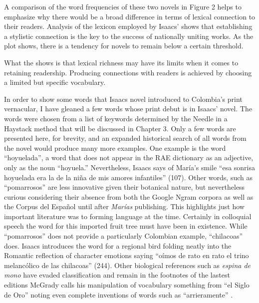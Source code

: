 A comparison of the word frequencies of these two novels in Figure 2 helps to emphasize why there would be a broad difference in terms of lexical connection to their readers.
Analysis of the lexicon employed by Isaacs' shows that establishing a stylistic connection is the key to the success of nationally uniting works. 
As the plot shows, there is a tendency for novels to remain below a certain threshold.

What the shows is that lexical richness may have its limits when it comes to retaining readership. 
Producing connections with readers is achieved by choosing a limited but specific vocabulary.


In order to show some words that Isaacs novel introduced to Colombia's print vernacular, I have gleaned a few words whose print debut is in Isaacs’ novel.
The words were chosen from a list of keywords determined by the Needle in a Haystack method that will be discussed in Chapter 3.
Only a few words are presented here, for brevity, and an expanded historical search of all words from the novel would produce many more examples.
One example is the word \enquote{hoyuelada}, a word that does not appear in the RAE dictionary as an adjective, only as the noun \enquote{hoyuela.}
Nevertheless, Isaacs says of María’s smile \enquote{esa sonrisa hoyuelada era la de la niña de mis amores infantiles} (107).
Other words, such as \enquote{pomarrosos} are less innovative given their botanical nature, but nevertheless curious considering their absence from both the Google Ngram corpora as well as the Corpus del Español until after \textit{Marías} publishing.
This highlights just how important literature was to forming language at the time.
Certainly in colloquial speech the word for this imported fruit tree must have been in existence.
While \enquote{pomarrosos} does not provide a particularly Colombian example, \enquote{chilacoas} does.
Isaacs introduces the word for a regional bird folding neatly into the Romantic reflection of character emotions saying \enquote{oímos de rato en rato el trino melancólico de las chilacoas} (244).
Other biological references such as \textit{espina de mono} have evaded classification and remain in the footnotes of the lastest editions
McGrady calls his manipulation of vocabulary something from \enquote{el Siglo de Oro} noting even complete inventions of words such as \enquote{arrieramente} \autocite[43]{McGrady2012}.

